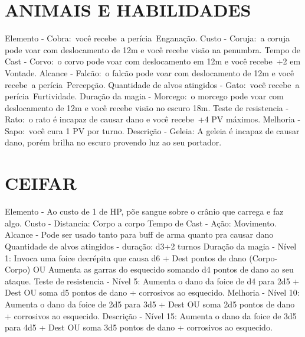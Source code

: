 \documentclass{article}%
\begin{document}
%
\section{ANIMAIS E HABILIDADES}%
\label{sec:ANIMAISEHABILIDADES}%
Elemento {-} Cobra:~você recebe~a perícia~Enganação.\newline%
Custo {-} Coruja:~a coruja pode voar com deslocamento de 12m e você recebe visão na penumbra.\newline%
Tempo de Cast {-} Corvo:~o corvo pode voar com deslocamento em 12m e você recebe~+2 em Vontade.\newline%
Alcance {-} Falcão:~o falcão pode voar com deslocamento de 12m e você recebe~a perícia~Percepção.\newline%
Quantidade de alvos atingidos {-} Gato:~você recebe~a perícia~Furtividade.\newline%
Duração da magia {-} Morcego:~o morcego pode voar com deslocamento de 12m e você recebe visão no escuro 18m.\newline%
Teste de resistencia {-} Rato:~o rato é incapaz de causar dano e você recebe~+4 PV máximos.\newline%
Melhoria {-} Sapo:~você cura 1 PV por turno.\newline%
Descrição {-} Geleia: A geleia é incapaz de causar dano, porém brilha no escuro provendo luz ao seu portador.\newline%

%
\section{CEIFAR}%
\label{sec:CEIFAR}%
Elemento {-}  Ao custo de 1 de HP, põe sangue sobre o crânio que carrega e faz algo.\newline%
Custo {-} Distancia: Corpo a corpo\newline%
Tempo de Cast {-} Ação: Movimento.\newline%
Alcance {-} Pode ser usado tanto para buff de arma quanto pra causar dano\newline%
Quantidade de alvos atingidos {-} duração: d3+2 turnos\newline%
Duração da magia {-} Nível 1: Invoca uma foice decrépita que causa d6 + Dest pontos de dano (Corpo{-}Corpo) OU Aumenta as garras do esquecido somando d4 pontos de dano ao seu ataque.\newline%
Teste de resistencia {-} Nível 5: Aumenta o dano da foice de d4 para 2d5 + Dest  OU soma d5 pontos de dano + corrosivos ao esquecido.\newline%
Melhoria {-} Nível 10: Aumenta o dano da foice de 2d5 para 3d5 + Dest OU soma 2d5 pontos de dano + corrosivos ao esquecido.\newline%
Descrição {-} Nível 15: Aumenta o dano da foice de 3d5 para 4d5 + Dest OU soma 3d5 pontos de dano + corrosivos ao esquecido.\newline%
\end{document}
